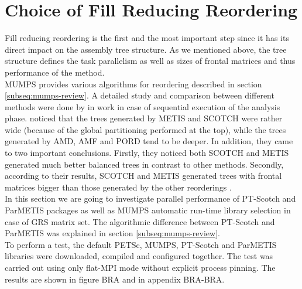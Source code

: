 \section{Choice of Fill Reducing Reordering}
\label{subseq:fill-in-reordering}

Fill reducing reordering is the first and the most important step since it has its direct impact on the assembly tree structure. As we mentioned above, the tree structure defines the task parallelism as well as sizes of frontal matrices and thus performance of the method.\\

MUMPS provides various algorithms for reordering described in section \ref{subseq:mumps-review}. A detailed study and comparison between different methods were done by \citeauthor{guermouche2003memory} in work \cite{guermouche2003memory} in case of sequential execution of the analysis phase. \citeauthor{guermouche2003memory} noticed that the trees generated by METIS and SCOTCH were rather wide (because of the global partitioning performed at the top), while the trees generated by AMD, AMF and PORD tend to be deeper. In addition, they came to two important conclusions. Firstly, they noticed both SCOTCH and METIS generated much better balanced trees in contrast to other methods. Secondly, according to their results, SCOTCH and METIS generated trees with frontal matrices bigger than those generated by the other reorderings \cite{guermouche2003memory}.\\


In this section we are going to investigate parallel performance of PT-Scotch and ParMETIS packages as well as MUMPS automatic run-time library selection in case of GRS matrix set. The algorithmic difference between PT-Scotch and ParMETIS was explained in section \ref{subseq:mumps-review}.\\


To perform a test, the default PETSc, MUMPS, PT-Scotch and ParMETIS libraries were downloaded, compiled and configured together. The test was carried out using only flat-MPI mode without explicit process pinning. The results are shown in figure BRA and in appendix BRA-BRA.\\


